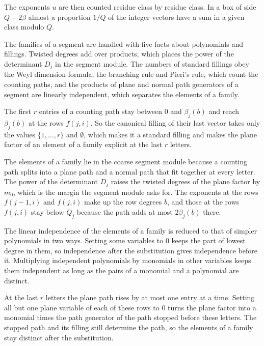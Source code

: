 The exponents $u$ are then counted residue class by residue class. In a box of side $Q-2\beta$ almost a proportion $1/Q$
of the integer vectors have a sum in a given class modulo $Q$.

The families of a segment are handled with five facts about polynomials and fillings. Twisted degrees add over
products, which places the power of the determinant $D_j$ in the segment module. The numbers of standard fillings obey
the Weyl dimension formula, the branching rule and Pieri's rule, which count the counting paths, and the products of
plane and normal path generators of a segment are linearly independent, which separates the elements of a family.

The first $r$ entries of a counting path stay between $0$ and $\beta_j(b)$ and reach $\beta_j(b)$ at the rows $f(j,i)$.
So the canonical filling of their last vector takes only the values $\{1,\dots,r\}$ and $\emptyset$, which makes it a
standard filling and makes the plane factor of an element of a family explicit at the last $r$ letters.

The elements of a family lie in the coarse segment module because a counting path splits into a plane path and a
normal path that fit together at every letter. The power of the determinant $D_j$ raises the twisted degrees of the plane
factor by $m_0$, which is the margin the segment module asks for. The exponents at the rows $f(j-1,i)$ and $f(j,i)$ make
up the row degrees $b$, and those at the rows $f(j,i)$ stay below $Q_j$ because the path adds at most $2\beta_j(b)$ there.

The linear independence of the elements of a family is reduced to that of simpler polynomials in two ways. Setting
some variables to $0$ keeps the part of lowest degree in them, so independence after the substitution gives
independence before it. Multiplying independent polynomials by monomials in other variables keeps them independent
as long as the pairs of a monomial and a polynomial are distinct.

At the last $r$ letters the plane path rises by at most one entry at a time. Setting all but one plane variable of each
of these rows to $0$ turns the plane factor into a monomial times the path generator of the path stopped before these
letters. The stopped path and its filling still determine the path, so the elements of a family stay distinct after the
substitution.

